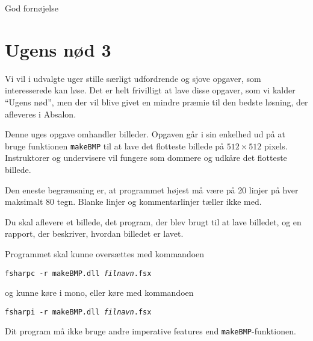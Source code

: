 \documentclass[a4paper]{article}
\begin{document}
\vspace{1ex}

\hfill God fornøjelse

\section*{Ugens nød 3}

Vi vil i udvalgte uger stille særligt udfordrende og sjove opgaver,
som interesserede kan løse.  Det er helt frivilligt at lave disse
opgaver, som vi kalder ``Ugens nød'', men der vil blive givet en
mindre præmie til den bedste løsning, der afleveres i Absalon.

Denne uges opgave omhandler billeder.  Opgaven går i sin enkelhed ud
på at bruge funktionen \texttt{makeBMP} til at lave det flotteste
billede på $512\times512$ pixels.
Instruktorer og undervisere vil fungere som dommere og udkåre det flotteste billede.

Den eneste begrænsning er, at programmet højest må være på 20 linjer
på hver maksimalt 80 tegn.  Blanke linjer og kommentarlinjer tæller
ikke med.

Du skal aflevere et billede, det program, der blev brugt til at lave
billedet, og en rapport, der beskriver, hvordan billedet er lavet.

Programmet skal kunne oversættes med kommandoen

\texttt{fsharpc -r makeBMP.dll \emph{filnavn}.fsx}

og kunne køre i mono, eller køre med kommandoen

\texttt{fsharpi -r makeBMP.dll \emph{filnavn}.fsx}



Dit program må ikke bruge andre imperative
features end \texttt{makeBMP}-funktionen.
\end{document}
